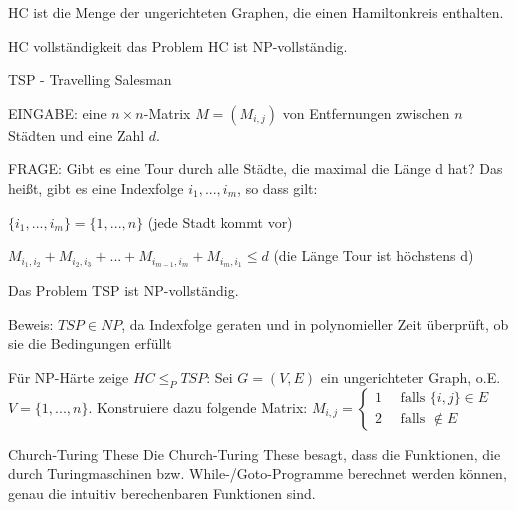\documentclass[avery5371, frame]{flashcards}
\begin{document}
\begin{flashcard}[Definition]{HC}
    ist die Menge der ungerichteten Graphen, die einen Hamiltonkreis enthalten.
\end{flashcard}

\begin{flashcard}[Satz]{HC vollständigkeit}
    das Problem HC ist NP-vollständig.
\end{flashcard}

\begin{flashcard}{TSP - Travelling Salesman}
    \begin{itemize*}
        \item EINGABE: eine $n\times n$-Matrix $M = (M_{i,j})$ von Entfernungen zwischen $n$ Städten und eine Zahl $d$.
        \item FRAGE: Gibt es eine Tour durch alle Städte, die maximal die Länge d hat? Das heißt, gibt es eine Indexfolge $i_1,...,i_m$, so dass gilt:
        \item $\{i_1,...,i_m\} = \{1,...,n\}$ (jede Stadt kommt vor)
        \item $M_{i_1,i_2} + M_{i_2,i_3} +...+ M_{i_{m-1},i_m} + M_{i_m,i_1} \leq d$ (die Länge Tour ist höchstens d)
    \end{itemize*}
\end{flashcard}

\begin{flashcard}[Satz]{Das Problem TSP}
    ist NP-vollständig.
    \begin{itemize*}
        \item Beweis: $TSP\in NP$, da Indexfolge geraten und in polynomieller Zeit überprüft, ob sie die Bedingungen erfüllt
        \item Für NP-Härte zeige $HC\leq_P TSP$: Sei $G=(V,E)$ ein ungerichteter Graph, o.E. $V=\{1,...,n\}$. Konstruiere dazu folgende Matrix: $M_{i,j}=\begin{cases} 1\quad\text{ falls } \{i,j\}\in E\\ 2 \quad\text{ falls }\not\in E\end{cases}$
    \end{itemize*}
\end{flashcard}

\begin{flashcard}{Church-Turing These}
    Die Church-Turing These besagt, dass die Funktionen, die durch Turingmaschinen bzw. While-/Goto-Programme berechnet werden können, genau die intuitiv berechenbaren Funktionen sind.
\end{flashcard}
\end{document}

